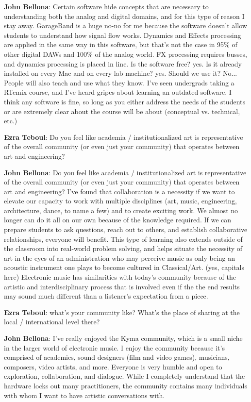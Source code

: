 \textbf{John Bellona}: Certain software hide concepts that are necessary to
understanding both the analog and digital domains, and for this type of reason I stay
away. GarageBand is a huge no-no for me because the software doesn't allow students to
understand how signal flow works. Dynamics and Effects processing are applied in the
same way in this software, but that's not the case in 95\% of other digital DAWs and
100\% of the analog world. FX processing requires busses, and dynamics processing is
placed in line. Is the software free? yes. Is it already installed on every Mac and on
every lab machine? yes. Should we use it? No... People will also teach and use what they
know. I've seen undergrads taking a RTcmix course, and I've heard gripes about learning
an outdated software. I think any software is fine, so long as you either address the
needs of the students or are extremely clear about the course will be about (conceptual
vs. technical, etc.)

\textbf{Ezra Teboul}: Do you feel like academia / institutionalized art is
representative of the overall community (or even just your community) that operates
between art and engineering?

\textbf{John Bellona}: Do you feel like academia / institutionalized art is
representative of the overall community (or even just your community) that operates
between art and engineering? I've found that collaboration is a necessity if we want to
elevate our capacity to work with multiple disciplines (art, music, engineering,
architecture, dance, to name a few) and to create exciting work. We almost no longer can
do it all on our own because of the knowledge required. If we can prepare students to
ask questions, reach out to others, and establish collaborative relationships, everyone
will benefit. This type of learning also extends outside of the classroom into
real-world problem solving, and helps situate the necessity of art in the eyes of an
administration who may perceive music as only being an acoustic instrument one plays to
become cultured in Classical/Art. (yes, capitals here) Electronic music has similarities
with today's community because of the artistic and interdisciplinary process that is
involved even if the the end results may sound much different than a listener's
expectation from a piece.

\textbf{Ezra Teboul}: what's your community like? What's the place of sharing at the
local / international level there?

\textbf{John Bellona}: I've really enjoyed the Kyma community, which is a small niche in
the larger world of electronic music. I enjoy the community because it's comprised of
academics, sound designers (film and video games), musicians, composers, video artists,
and more. Everyone is very humble and open to exploration, collaboration, and dialogue.
While I completely understand that the hardware locks out many practitioners, the
community contains many individuals with whom I want to have artistic conversations with.

